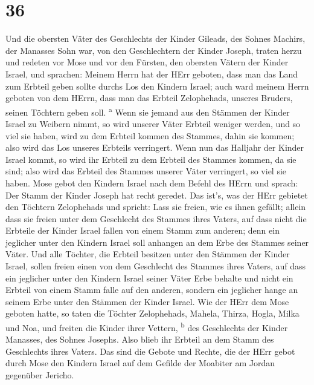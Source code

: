 \hypertarget{section-35}{%
\section{36}\label{section-35}}

 Und die obersten Väter des Geschlechts der Kinder
Gileads, des Sohnes Machirs, der Manasses Sohn war, von den
Geschlechtern der Kinder Joseph, traten herzu und redeten vor Mose und
vor den Fürsten, den obersten Vätern der Kinder Israel, 
und sprachen: Meinem Herrn hat der HErr geboten, dass man das Land zum
Erbteil geben sollte durchs Los den Kindern Israel; auch ward meinem
Herrn geboten von dem HErrn, dass man das Erbteil Zelophehads, unseres
Bruders, seinen Töchtern geben soll. \textsuperscript{a} 
Wenn sie jemand aus den Stämmen der Kinder Israel zu Weibern nimmt, so
wird unserer Väter Erbteil weniger werden, und so viel sie haben, wird
zu dem Erbteil kommen des Stammes, dahin sie kommen; also wird das Los
unseres Erbteils verringert.  Wenn nun das Halljahr der
Kinder Israel kommt, so wird ihr Erbteil zu dem Erbteil des Stammes
kommen, da sie sind; also wird das Erbteil des Stammes unserer Väter
verringert, so viel sie haben.  Mose gebot den Kindern
Israel nach dem Befehl des HErrn und sprach: Der Stamm der Kinder Joseph
hat recht geredet.  Das ist's, was der HErr gebietet den
Töchtern Zelophehads und spricht: Lass sie freien, wie es ihnen gefällt;
allein dass sie freien unter dem Geschlecht des Stammes ihres Vaters,
 auf dass nicht die Erbteile der Kinder Israel fallen von
einem Stamm zum anderen; denn ein jeglicher unter den Kindern Israel
soll anhangen an dem Erbe des Stammes seiner Väter.  Und
alle Töchter, die Erbteil besitzen unter den Stämmen der Kinder Israel,
sollen freien einen von dem Geschlecht des Stammes ihres Vaters, auf
dass ein jeglicher unter den Kindern Israel seiner Väter Erbe behalte
 und nicht ein Erbteil von einem Stamm falle auf den
anderen, sondern ein jeglicher hange an seinem Erbe unter den Stämmen
der Kinder Israel.  Wie der HErr dem Mose geboten hatte,
so taten die Töchter Zelophehads,  Mahela, Thirza, Hogla,
Milka und Noa, und freiten die Kinder ihrer Vettern, \textsuperscript{b}
 des Geschlechts der Kinder Manasses, des Sohnes Josephs.
Also blieb ihr Erbteil an dem Stamm des Geschlechts ihres Vaters.
 Das sind die Gebote und Rechte, die der HErr gebot durch
Mose den Kindern Israel auf dem Gefilde der Moabiter am Jordan gegenüber
Jericho.
